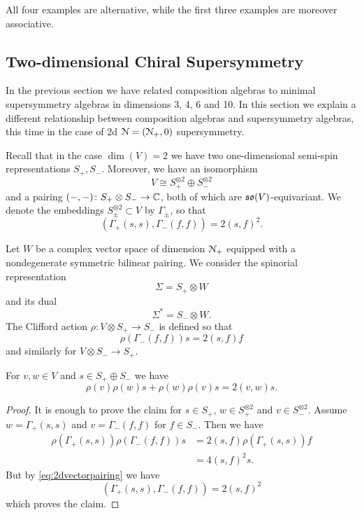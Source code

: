 \documentclass[10pt, oneside]{article}
\begin{document}
All four examples are alternative, while the first three examples are moreover associative.

\subsection{Two-dimensional Chiral Supersymmetry} \label{sect:2dchiral}

In the previous section we have related composition algebras to minimal supersymmetry algebras in dimensions 3, 4, 6 and 10. In this section we explain a different relationship between composition algebras and supersymmetry algebras, this time in the case of 2d $\mathcal N=(\mathcal N_+, 0)$ supersymmetry.

Recall that in the case $\dim(V) = 2$ we have two one-dimensional semi-spin representations $S_+, S_-$. Moreover, we have an isomorphism
\[V\cong S_+^{\otimes 2}\oplus S_-^{\otimes 2}\]
and a pairing $( -, -)\colon S_+\otimes S_-\rightarrow \mathbb C$, both of which are $\mathfrak{so}(V)$-equivariant. We denote the embeddings $S_{\pm}^{\otimes 2}\subset V$ by $\Gamma_{\pm}$, so that
\begin{equation}
(\Gamma_+(s, s), \Gamma_-(f, f)) = 2(s, f)^2.
\label{eq:2dvectorpairing}
\end{equation}

Let $W$ be a complex vector space of dimension $\mathcal N_+$ equipped with a nondegenerate symmetric bilinear pairing. We consider the spinorial representation
\[\Sigma = S_+\otimes W\]
and its dual
\[\Sigma^* = S_-\otimes W.\]
The Clifford action $\rho \colon V\otimes S_+\rightarrow S_-$ is defined so that
\[\rho(\Gamma_-(f, f)) s = 2(s, f) f\]
and similarly for $V\otimes S_-\rightarrow S_+$.

\begin{prop}
For $v,w\in V$ and $s\in S_+\oplus S_-$ we have
\[\rho(v)\rho(w)s + \rho(w)\rho(v) s = 2(v, w) s.\]
\end{prop}
\begin{proof}
It is enough to prove the claim for $s\in S_+$, $w\in S_+^{\otimes 2}$ and $v\in S_-^{\otimes 2}$. Assume $w=\Gamma_+(s, s)$ and $v = \Gamma_-(f, f)$ for $f\in S_-$. Then we have
\begin{align*}
\rho(\Gamma_+(s, s)) \rho(\Gamma_-(f, f)) s &= 2(s, f) \rho(\Gamma_+(s, s)) f \\
&= 4(s, f)^2 s.
\end{align*}
But by \eqref{eq:2dvectorpairing} we have
\[(\Gamma_+(s, s), \Gamma_-(f, f)) = 2(s, f)^2\]
which proves the claim.
\end{proof}
\end{document}
